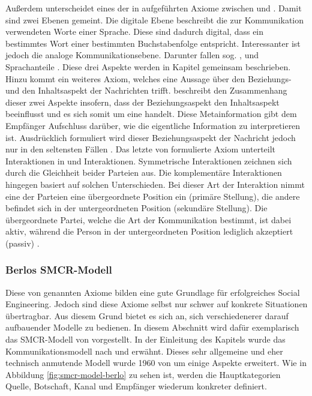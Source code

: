 Außerdem unterscheidet eines der in \citep[S. 56]{watzlawick} aufgeführten Axiome zwischen  und . Damit sind zwei Ebenen gemeint.
Die digitale Ebene beschreibt die zur Kommunikation verwendeten Worte einer Sprache.
Diese sind dadurch digital, dass ein bestimmtes Wort einer bestimmten Buchstabenfolge entspricht.
Interessanter ist jedoch die analoge Kommunikationsebene.
Darunter fallen sog. ,  und  Sprachanteile \citep{grundlagen-der-kommunikation}.
Diese drei Aspekte werden in Kapitel  gemeinsam beschrieben.
Hinzu kommt ein weiteres Axiom, welches eine Aussage über den Beziehungs- und den Inhaltsaspekt \citep{watzlawick} der Nachrichten trifft.
 beschreibt den Zusammenhang dieser zwei Aspekte insofern, dass der Beziehungsaspekt den Inhaltsaspekt beeinflusst und es sich somit um eine  handelt.
Diese Metainformation gibt dem Empfänger Aufschluss darüber, wie die eigentliche Information zu interpretieren ist.
Ausdrücklich formuliert wird dieser Beziehungsaspekt der Nachricht jedoch nur in den seltensten Fällen \citep{grundlagen-der-kommunikation}.
Das letzte von \citep[S. 50ff]{watzlawick} formulierte Axiom unterteilt Interaktionen in  und  Interaktionen.
Symmetrische Interaktionen zeichnen sich durch die Gleichheit beider Parteien aus.
Die komplementäre Interaktionen hingegen basiert auf solchen Unterschieden.
Bei dieser Art der Interaktion nimmt eine der Parteien eine übergeordnete Position ein (primäre Stellung), die andere befindet sich in der untergeordneten Position (sekundäre Stellung).
Die übergeordnete Partei, welche die Art der Kommunikation bestimmt, ist dabei aktiv, während die Person in der untergeordneten Position lediglich akzeptiert (passiv) \citep{grundlagen-der-kommunikation}.


\subsubsection{Berlos SMCR-Modell}

Diese von  genannten Axiome bilden eine gute Grundlage für erfolgreiches Social Engineering.
Jedoch sind diese Axiome selbst nur schwer auf konkrete Situationen übertragbar.
Aus diesem Grund bietet es sich an, sich verschiedenerer darauf aufbauender Modelle zu bedienen.
In diesem Abschnitt wird dafür exemplarisch das SMCR-Modell von  vorgestellt.
In der Einleitung des Kapitels  wurde das Kommunikationsmodell nach  und  erwähnt.
Dieses sehr allgemeine und eher technisch anmutende Modell wurde 1960 von  um einige Aspekte erweitert.
Wie in Abbildung \ref{fig:smcr-model-berlo} zu sehen ist, werden die Hauptkategorien Quelle, Botschaft, Kanal und Empfänger wiederum konkreter definiert.

